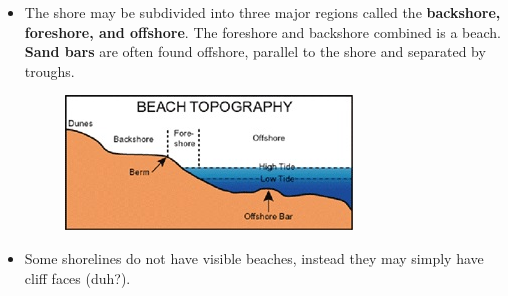 \documentclass{article}
\begin{document}
	\begin{itemize}
		\item The shore may be subdivided into three major regions called the \textbf{backshore, foreshore, and offshore}. The foreshore and backshore combined is a beach. \textbf{Sand bars} are often found offshore, parallel to the shore and separated by troughs.
		\begin{figure}[H]
   		\centering
    		\includegraphics[scale=0.8]{./Images/BC6_BeachProfile.jpg}
		\end{figure}
		\item Some shorelines do not have visible beaches, instead they may simply have cliff faces (duh?).
	\end{itemize}
\end{document}
